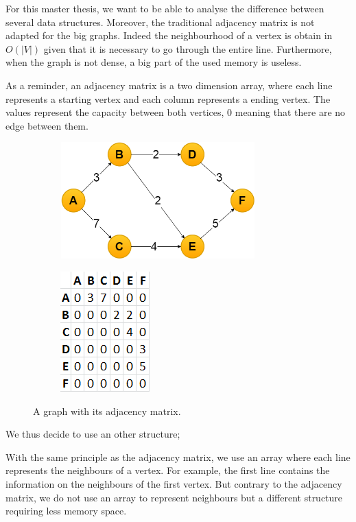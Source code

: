For this master thesis, we want to be able to analyse the difference between several data structures. Moreover, the traditional adjacency matrix \cite{lectu5} is not adapted for the big graphs. Indeed the neighbourhood of a vertex is obtain in $O(|V|)$ given that it is necessary to go through the entire line. Furthermore, when the graph is not dense, a big part of the used memory is useless.

As a reminder, an adjacency matrix is a two dimension array, where each line represents a starting vertex and each column represents a ending vertex. The values represent the capacity between both vertices, 0 meaning that there are no edge between them. \newline

\begin{figure}[!h]
\begin{subfigure}{.6\textwidth}
\includegraphics[width=7.5cm,height=4.5cm]{images/graph.png}
\end{subfigure}
\begin{subfigure}{.4\textwidth}
\includegraphics[scale=0.7]{images/adjacencyMatrix.png}
\end{subfigure}
\caption{A graph with its adjacency matrix.}
\end{figure}

We thus decide to use an other structure; \newline

With the same principle as the adjacency matrix, we use an array where each line represents the neighbours of a vertex. For example, the first line contains the information on the neighbours of the first vertex. But contrary to the adjacency matrix, we do not use an array to represent neighbours but a different structure requiring less memory space. \newline

